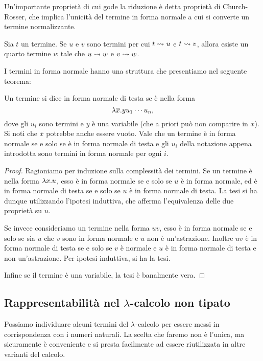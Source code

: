 \documentclass[]{marticle}
\begin{document}
Un'importante propriet\`a di cui gode la riduzione \`e detta propriet\`a di
Church-Rosser, che implica l'unicit\`a del termine in forma normale a cui si
converte un termine normalizzante.

\begin{block}[Teorema]
    Sia $t$ un termine. Se $u$ e $v$ sono termini per cui $t\rightsquigarrow u$ e $t\rightsquigarrow
    v$, allora esiste un quarto termine $w$ tale che $u\rightsquigarrow w$ e $v\rightsquigarrow w$.
\end{block}

I termini in forma normale hanno una struttura che presentiamo nel seguente
teorema:
\begin{block}[Proposizione]
    \label{head}
    Un termine si dice in forma normale di testa se \`e nella forma
    \[
        \lambda \overline{x}.yu_1\cdots u_n,
    \]
    dove gli $u_i$ sono termini e $y$ \`e una variabile (che a priori pu\`o non
    comparire in $\overline{x}$). Si noti che $\overline{x}$ potrebbe anche
    essere vuoto. Vale che un termine \`e in forma normale se e solo se \`e in
    forma normale di testa e gli $u_i$ della notazione appena introdotta sono
    termini in forma normale per ogni $i$.
\end{block}
\begin{proof}
    Ragioniamo per induzione sulla complessit\`a dei termini. Se un termine \`e
    nella forma $\lambda x.u$, esso \`e in forma normale se e solo se $u$ \`e in
    forma normale, ed \`e in forma normale di testa se e solo se $u$ \`e in
    forma normale di testa. La tesi si ha dunque utilizzando l'ipotesi
    induttiva, che afferma l'equivalenza delle due propriet\`a su $u$. 

    Se invece consideriamo un termine nella forma $uv$, esso \`e in forma
    normale se e solo se sia $u$ che $v$ sono in forma normale e $u$ non \`e
    un'astrazione. Inoltre $uv$ \`e in forma normale di testa se e solo se $v$
    \`e normale e $u$ \`e in forma normale di testa e non un'astrazione. Per
    ipotesi induttiva, si ha la tesi.

    Infine se il termine \`e una variabile, la tesi \`e banalmente vera.
\end{proof}

\subsection{Rappresentabilit\`a nel $\lambda$-calcolo non tipato}

Possiamo individuare alcuni termini del $\lambda$-calcolo per essere messi in
corrispondenza con i numeri naturali. La scelta che faremo non \`e l'unica, ma
sicuramente \`e conveniente e si presta facilmente ad essere riutilizzata in
altre varianti del calcolo.
\end{document}
